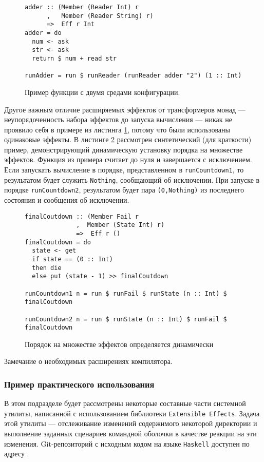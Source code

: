\begin{figure}[t]
\begin{lstlisting}
adder :: (Member (Reader Int) r
      ,   Member (Reader String) r) 
      =>  Eff r Int
adder = do
  num <- ask
  str <- ask
  return $ num + read str

runAdder = run $ runReader (runReader adder "2") (1 :: Int)
\end{lstlisting}
\caption{Пример функции с двумя средами конфигурации.}
\label{listing:extEff2Readers}
\end{figure} 

Другое важным отличие расширяемых эффектов от трансформеров монад --- неупорядоченность набора эффектов до запуска вычисления --- никак не проявило себя в примере из листинга \ref{listing:extEff2Readers}, потому что были использованы одинаковые эффекты. В листинге \ref{listing:extEffOrdering} рассмотрен синтетический (для краткости) пример, демонстрирующий динамическую установку порядка на множестве эффектов. Функция из примера считает до нуля и завершается с исключением. Если запускать вычисление в порядке, представленном в \lstinline{runCountdown1}, то результатом будет служить \lstinline{Nothing}, сообщающий об исключении. При запуске в порядке \lstinline{runCountdown2}, результатом будет пара \lstinline{(0,Nothing)} из последнего состояния и сообщения об исключении.      

\begin{figure}[t]
\begin{lstlisting}
finalCoutdown :: (Member Fail r
              ,  Member (State Int) r)
              =>  Eff r ()
finalCoutdown = do
  state <- get
  if state == (0 :: Int) 
  then die
  else put (state - 1) >> finalCoutdown 

runCountdown1 n = run $ runFail $ runState (n :: Int) $ finalCoutdown

runCountdown2 n = run $ runState (n :: Int) $ runFail $ finalCoutdown
\end{lstlisting}
\caption{Порядок на множестве эффектов определяется динамически}
\label{listing:extEffOrdering}
\end{figure} 

Замечание о необходимых расширениях компилятора.

\subsubsection{Пример практического использования}

В этом подразделе будет рассмотрены некоторые составные части системной утилиты, написанной с использованием библиотеки \lstinline{Extensible Effects}. Задача этой утилиты --- отслеживание изменений содержимого некоторой директории и выполнение заданных сценариев командной оболочки в качестве реакции на эти изменения. Git-репозиторий с исходным кодом на языке \lstinline{Haskell} доступен по адресу \autocite{FileTrigger}. 

